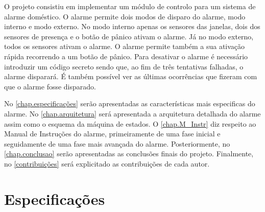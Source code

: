 \documentclass{report}
\begin{document}
O projeto consistiu em implementar um módulo de controlo para um sistema de alarme doméstico. O alarme permite dois modos de disparo do alarme, modo interno e modo externo. No modo interno apenas os sensores das janelas, dois dos sensores de presença e o botão de pânico ativam o alarme. Já no modo externo, todos os sensores ativam o alarme. O alarme permite também a sua ativação rápida recorrendo a um botão de pânico. Para desativar o alarme é necessário introduzir um código secreto sendo que, ao fim de três tentativas falhadas, o alarme disparará. É também possível ver as últimas ocorrências que fizeram com que o alarme fosse disparado.

No \autoref{chap.especificações} serão apresentadas as características mais especificas do alarme. No \autoref{chap.arquitetura} será apresentada a arquitetura detalhada do alarme assim como o esquema da máquina de estados. O \autoref{chap.M_Instr} diz respeito ao Manual de Instruções do alarme, primeiramente de uma fase inicial e seguidamente de uma fase mais avançada do alarme. Posteriormente, no \autoref{chap.conclusao} serão apresentadas as conclusões finais do projeto. Finalmente, no \autoref{contribuições} será explicitado as contribuições de cada autor.
	



\chapter{Especificações}
\label{chap.especificações}
	
\end{document}
